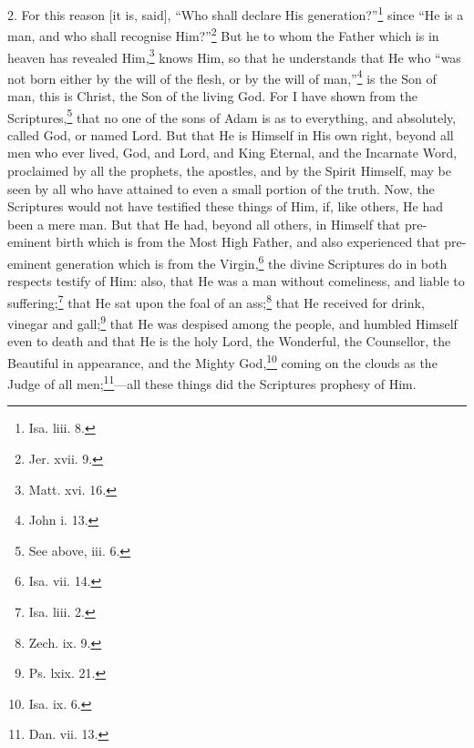 2. For this reason [it is, said], “Who shall declare His generation?”\footnote{Isa. liii. 8.} since “He is a man, and who shall recognise Him?”\footnote{Jer. xvii. 9.} But he to whom the Father which is in heaven has revealed Him,\footnote{Matt. xvi. 16.} knows Him, so that he understands that He who “was not born either by the will of the flesh, or by the will of man,”\footnote{John i. 13.} is the Son of man, this is Christ, the Son of the living God. For I have shown from the Scriptures,\footnote{See above, iii. 6.} that no one of the sons of Adam is as to everything, and absolutely, called God, or named Lord. But that He is Himself in His own right, beyond all men who ever lived, God, and Lord, and King Eternal, and the Incarnate Word, proclaimed by all the prophets, the apostles, and by the Spirit Himself, may be seen by all who have attained to even a small portion of the truth. Now, the Scriptures would not have testified these things of Him, if, like others, He had been a mere man. But that He had, beyond all others, in Himself that pre-eminent birth which is from the Most High Father, and also experienced that pre-eminent generation which is from the Virgin,\footnote{Isa. vii. 14.} the divine Scriptures do in both respects testify of Him: also, that He was a man without comeliness, and liable to suffering;\footnote{Isa. liii. 2.} that He sat upon the foal of an ass;\footnote{Zech. ix. 9.} that He received for drink, vinegar and gall;\footnote{Ps. lxix. 21.} that He was despised among the people, and humbled Himself even to death and that He is the holy Lord, the Wonderful, the Counsellor, the Beautiful in appearance, and the Mighty God,\footnote{Isa. ix. 6.} coming on the clouds as the Judge of all men;\footnote{Dan. vii. 13.}—all these things did the Scriptures prophesy of Him.

